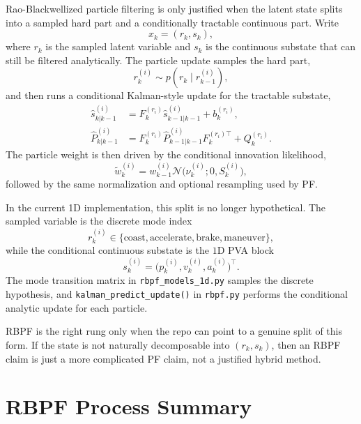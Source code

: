 \documentclass[11pt]{article}
\begin{document}
Rao-Blackwellized particle filtering is only justified when the latent state
splits into a sampled hard part and a conditionally tractable continuous part.
Write
\begin{equation}
    x_k = (r_k, s_k),
\end{equation}
where \(r_k\) is the sampled latent variable and \(s_k\) is the continuous
substate that can still be filtered analytically. The particle update samples
the hard part,
\begin{equation}
    r_k^{(i)} \sim p(r_k \mid r_{k-1}^{(i)}),
\end{equation}
and then runs a conditional Kalman-style update for the tractable substate,
\begin{align}
    \hat{s}_{k|k-1}^{(i)}
    &=
    F_k^{(r_i)} \hat{s}_{k-1|k-1}^{(i)} + b_k^{(r_i)},
    \\
    \hat{P}_{k|k-1}^{(i)}
    &=
    F_k^{(r_i)} \hat{P}_{k-1|k-1}^{(i)} F_k^{(r_i)\top} + Q_k^{(r_i)}.
\end{align}
The particle weight is then driven by the conditional innovation likelihood,
\begin{equation}
    \tilde{w}_k^{(i)}
    =
    w_{k-1}^{(i)}
    \mathcal{N}\!\big(\nu_k^{(i)}; 0, S_k^{(i)}\big),
\end{equation}
followed by the same normalization and optional resampling used by PF.

In the current 1D implementation, this split is no longer hypothetical. The
sampled variable is the discrete mode index
\begin{equation}
    r_k^{(i)} \in \{\text{coast},\text{accelerate},\text{brake},\text{maneuver}\},
\end{equation}
while the conditional continuous substate is the \(1\text{D}\) PVA block
\begin{equation}
    s_k^{(i)} = \big(p_k^{(i)}, v_k^{(i)}, a_k^{(i)}\big)^\top.
\end{equation}
The mode transition matrix in \texttt{rbpf\_models\_1d.py} samples the discrete
hypothesis, and \texttt{kalman\_predict\_update()} in \texttt{rbpf.py}
performs the conditional analytic update for each particle.

RBPF is the right rung only when the repo can point to a genuine split of this
form. If the state is not naturally decomposable into \((r_k, s_k)\), then an
RBPF claim is just a more complicated PF claim, not a justified hybrid method.

\section{RBPF Process Summary}
\end{document}
